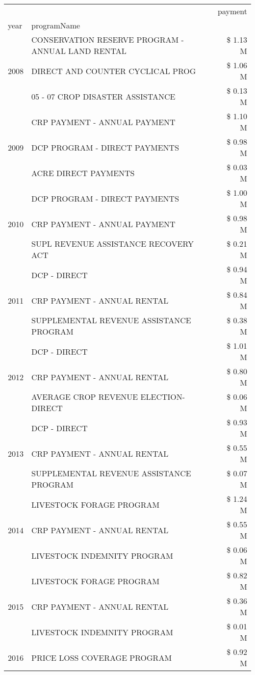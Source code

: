 \begin{tabular}{llr}
\toprule
 &  & payment \\
year & programName &  \\
\midrule
\multirow[t]{3}{*}{2008} & CONSERVATION RESERVE PROGRAM - ANNUAL LAND RENTAL & \$ 1.13 M \\
 & DIRECT AND COUNTER CYCLICAL PROG & \$ 1.06 M \\
 & 05 - 07 CROP DISASTER ASSISTANCE & \$ 0.13 M \\
\cline{1-3}
\multirow[t]{3}{*}{2009} & CRP PAYMENT - ANNUAL PAYMENT & \$ 1.10 M \\
 & DCP PROGRAM - DIRECT PAYMENTS & \$ 0.98 M \\
 & ACRE DIRECT PAYMENTS & \$ 0.03 M \\
\cline{1-3}
\multirow[t]{3}{*}{2010} & DCP PROGRAM - DIRECT PAYMENTS & \$ 1.00 M \\
 & CRP PAYMENT - ANNUAL PAYMENT & \$ 0.98 M \\
 & SUPL REVENUE ASSISTANCE RECOVERY ACT & \$ 0.21 M \\
\cline{1-3}
\multirow[t]{3}{*}{2011} & DCP - DIRECT & \$ 0.94 M \\
 & CRP PAYMENT - ANNUAL RENTAL & \$ 0.84 M \\
 & SUPPLEMENTAL REVENUE ASSISTANCE PROGRAM & \$ 0.38 M \\
\cline{1-3}
\multirow[t]{3}{*}{2012} & DCP - DIRECT & \$ 1.01 M \\
 & CRP PAYMENT - ANNUAL RENTAL & \$ 0.80 M \\
 & AVERAGE CROP REVENUE ELECTION-DIRECT & \$ 0.06 M \\
\cline{1-3}
\multirow[t]{3}{*}{2013} & DCP - DIRECT & \$ 0.93 M \\
 & CRP PAYMENT - ANNUAL RENTAL & \$ 0.55 M \\
 & SUPPLEMENTAL REVENUE ASSISTANCE PROGRAM & \$ 0.07 M \\
\cline{1-3}
\multirow[t]{3}{*}{2014} & LIVESTOCK FORAGE PROGRAM & \$ 1.24 M \\
 & CRP PAYMENT - ANNUAL RENTAL & \$ 0.55 M \\
 & LIVESTOCK INDEMNITY PROGRAM & \$ 0.06 M \\
\cline{1-3}
\multirow[t]{3}{*}{2015} & LIVESTOCK FORAGE PROGRAM & \$ 0.82 M \\
 & CRP PAYMENT - ANNUAL RENTAL & \$ 0.36 M \\
 & LIVESTOCK INDEMNITY PROGRAM & \$ 0.01 M \\
\cline{1-3}
\multirow[t]{3}{*}{2016} & PRICE LOSS COVERAGE PROGRAM & \$ 0.92 M \\

\end{tabular}

